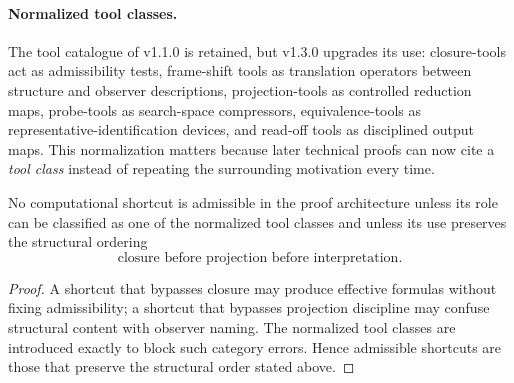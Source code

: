 \paragraph{Normalized tool classes.}
The tool catalogue of v1.1.0 is retained, but v1.3.0 upgrades its use:
closure-tools act as admissibility tests, frame-shift tools as translation
operators between structure and observer descriptions, projection-tools as
controlled reduction maps, probe-tools as search-space compressors,
equivalence-tools as representative-identification devices, and read-off tools
as disciplined output maps. This normalization matters because later technical
proofs can now cite a \emph{tool class} instead of repeating the surrounding
motivation every time.

\begin{corollary}
\label{cor:tool-usage-discipline}
No computational shortcut is admissible in the proof architecture unless its
role can be classified as one of the normalized tool classes and unless its use
preserves the structural ordering
\[
\text{closure before projection before interpretation}.
\]
\end{corollary}

\begin{proof}
A shortcut that bypasses closure may produce effective formulas without fixing
admissibility; a shortcut that bypasses projection discipline may confuse
structural content with observer naming. The normalized tool classes are
introduced exactly to block such category errors. Hence admissible shortcuts are
those that preserve the structural order stated above.
\end{proof}

